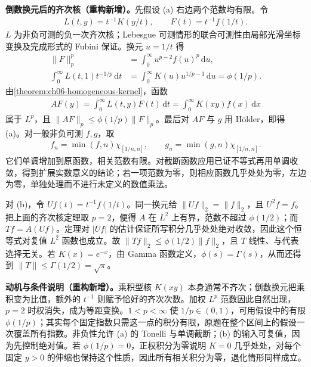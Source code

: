 \documentclass[../../main.tex]{subfiles}
\begin{document}
\begin{solution}
\textbf{倒数换元后的齐次核（重构新增）。}先假设 (a) 右边两个范数均有限。令
\begin{align*}
L(t,y)=t^{-1}K(y/t),\qquad F(t)=t^{-1}f(1/t).
\end{align*}
$L$ 为非负可测的负一次齐次核；Lebesgue 可测情形的联合可测性由局部光滑坐标变换及完成形式的 Fubini 保证。换元 $u=1/t$ 得
\begin{align*}
\|F\|_p^p&=\int_0^\infty u^{p-2}f(u)^p\,\mathrm du,\\
\int_0^\infty L(t,1)t^{-1/p}\,\mathrm dt
&=\int_0^\infty K(u)u^{1/p-1}\,\mathrm du=\phi(1/p).
\end{align*}
由\cref{theorem:ch06-homogeneous-kernel}，函数
\begin{align*}
AF(y)=\int_0^\infty L(t,y)F(t)\,\mathrm dt
=\int_0^\infty K(xy)f(x)\,\mathrm dx
\end{align*}
属于 $L^p$，且 $\|AF\|_p\leqslant\phi(1/p)\|F\|_p$。最后对 $AF$ 与 $g$ 用 Hölder，即得 (a)。对一般非负可测 $f,g$，取
\begin{align*}
f_n=\min(f,n)\chi_{[1/n,n]},\qquad g_n=\min(g,n)\chi_{[1/n,n]}.
\end{align*}
它们单调增加到原函数，相关范数有限。对截断函数应用已证不等式再用单调收敛，得到扩展实数意义的结论；若一项范数为零，则相应函数几乎处处为零，左边为零，单独处理而不进行未定义的数值乘法。

对 (b)，令 $Uf(t)=t^{-1}f(1/t)$。同一换元给 $\|Uf\|_2=\|f\|_2$，且 $U^2f=f$。把上面的齐次核定理取 $p=2$，便得 $A$ 在 $L^2$ 上有界，范数不超过 $\phi(1/2)$；而 $Tf=A(Uf)$。定理对 $|Uf|$ 的估计保证所写积分几乎处处绝对收敛，因此这个恒等式对复值 $L^2$ 函数也成立。故 $\|Tf\|_2\leqslant\phi(1/2)\|f\|_2$，且 $T$ 线性、与代表选择无关。若 $K(x)=e^{-x}$，由 Gamma 函数定义，$\phi(s)=\Gamma(s)$，从而还得到 $\|T\|\leqslant\Gamma(1/2)=\sqrt\pi$。
\end{solution}
\begin{remark}
\textbf{动机与条件说明（重构新增）。}乘积型核 $K(xy)$ 本身通常不齐次；倒数换元把乘积变为比值，额外的 $t^{-1}$ 则赋予恰好的齐次次数。加权 $L^p$ 范数因此自然出现，$p=2$ 时权消失，成为等距变换。$1<p<\infty$ 使 $1/p\in(0,1)$，可用假设中的有限 $\phi(1/p)$；其实每个固定指数只需这一点的积分有限，原题在整个区间上的假设一次覆盖所有指数。非负性允许 (a) 的 Tonelli 与单调截断；(b) 的输入可复值，因为先控制绝对值。若 $\phi(1/p)=0$，正权积分为零说明 $K=0$ 几乎处处，对每个固定 $y>0$ 的伸缩也保持这个性质，因此所有相关积分为零，退化情形同样成立。
\end{remark}
\end{document}
